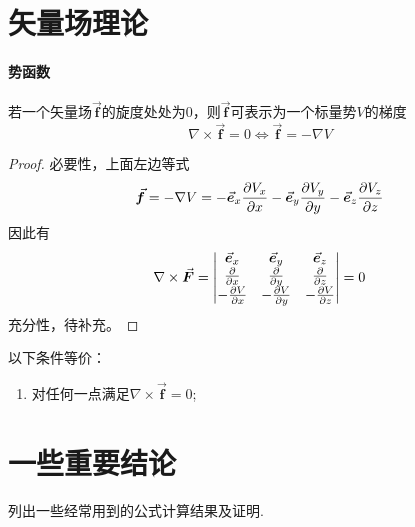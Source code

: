 \section{矢量场理论}
\paragraph{势函数}
若一个矢量场$\vec{\bm{f}}$的旋度处处为0，则$\vec{\bm{f}}$可表示为一个标量势$V$的梯度
\begin{equation}
    \nabla \times \vec{\bm{f}} = 0 \Leftrightarrow \vec{\bm{f}} = -\nabla V
    \label{eq:scalar-poten}
\end{equation}
\begin{proof}
    必要性，上面左边等式
    \begin{equation*}
        \vec{\bm{f}} = - \nabla V = -\vec{\bm{e}}_x \frac{\partial V_x}{\partial x}
                            -\vec{\bm{e}}_y \frac{\partial V_y}{\partial y}
                            -\vec{\bm{e}}_z \frac{\partial V_z}{\partial z}
    \end{equation*}
    因此有
    \begin{equation*}
        \nabla \times \vec{\bm{F}} = \left|\begin{matrix}
            \vec{\bm{e}}_x  &   \vec{\bm{e}}_y  &   \vec{\bm{e}}_z  \\
            \frac{\partial}{\partial x} & \frac{\partial}{\partial y} & \frac{\partial}{\partial z} \\
            -\frac{\partial V}{\partial x} & -\frac{\partial V}{\partial y} & -\frac{\partial V}{\partial z}
        \end{matrix}\right|
        = 0
    \end{equation*}
    充分性，待补充。
\end{proof}

\begin{theorem}[无旋场]
    以下条件等价：
    \begin{enumerate}
        \item 对任何一点满足$\nabla \times \vec{\bm{f}} = 0$;
    \end{enumerate}
\end{theorem}

\section{一些重要结论}
列出一些经常用到的公式计算结果及证明.

